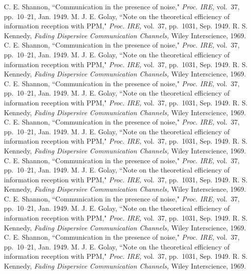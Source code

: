 \documentclass[11pt]{now}
\begin{document}
\begin{thebibliography}{99}
C. E. Shannon, ``Communication in the presence of noise," {\em Proc.
IRE,} vol.~37, pp.~10--21, Jan. 1949.
M. J. E. Golay, ``Note on the theoretical efficiency of information
reception with PPM," {\em Proc. IRE,} vol.~37, pp.~1031, Sep. 1949.
R. S. Kennedy, {\em Fading Dispersive Communication Channels,} Wiley
Interscience, 1969.
C. E. Shannon, ``Communication in the presence of noise," {\em Proc.
IRE,} vol.~37, pp.~10--21, Jan. 1949.
M. J. E. Golay, ``Note on the theoretical efficiency of information
reception with PPM," {\em Proc. IRE,} vol.~37, pp.~1031, Sep. 1949.
R. S. Kennedy, {\em Fading Dispersive Communication Channels,} Wiley
Interscience, 1969.
C. E. Shannon, ``Communication in the presence of noise," {\em Proc.
IRE,} vol.~37, pp.~10--21, Jan. 1949.
M. J. E. Golay, ``Note on the theoretical efficiency of information
reception with PPM," {\em Proc. IRE,} vol.~37, pp.~1031, Sep. 1949.
R. S. Kennedy, {\em Fading Dispersive Communication Channels,} Wiley
Interscience, 1969.
C. E. Shannon, ``Communication in the presence of noise," {\em Proc.
IRE,} vol.~37, pp.~10--21, Jan. 1949.
M. J. E. Golay, ``Note on the theoretical efficiency of information
reception with PPM," {\em Proc. IRE,} vol.~37, pp.~1031, Sep. 1949.
R. S. Kennedy, {\em Fading Dispersive Communication Channels,} Wiley
Interscience, 1969.
C. E. Shannon, ``Communication in the presence of noise," {\em Proc.
IRE,} vol.~37, pp.~10--21, Jan. 1949.
M. J. E. Golay, ``Note on the theoretical efficiency of information
reception with PPM," {\em Proc. IRE,} vol.~37, pp.~1031, Sep. 1949.
R. S. Kennedy, {\em Fading Dispersive Communication Channels,} Wiley
Interscience, 1969.
C. E. Shannon, ``Communication in the presence of noise," {\em Proc.
IRE,} vol.~37, pp.~10--21, Jan. 1949.
M. J. E. Golay, ``Note on the theoretical efficiency of information
reception with PPM," {\em Proc. IRE,} vol.~37, pp.~1031, Sep. 1949.
R. S. Kennedy, {\em Fading Dispersive Communication Channels,} Wiley
Interscience, 1969.
C. E. Shannon, ``Communication in the presence of noise," {\em Proc.
IRE,} vol.~37, pp.~10--21, Jan. 1949.
M. J. E. Golay, ``Note on the theoretical efficiency of information
reception with PPM," {\em Proc. IRE,} vol.~37, pp.~1031, Sep. 1949.
R. S. Kennedy, {\em Fading Dispersive Communication Channels,} Wiley
Interscience, 1969.
\end{thebibliography}
\end{document}
